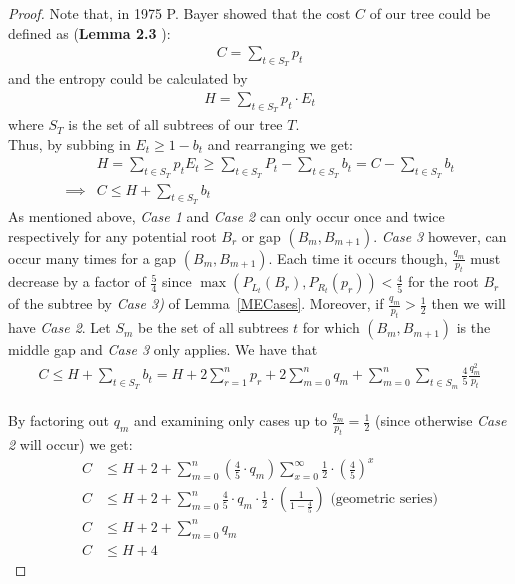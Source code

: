 \documentclass[letterpaper,12pt,titlepage,oneside,final]{book}
\theoremstyle{plain}
\begin{document}
\begin{proof}
Note that, in 1975 P. Bayer showed that the cost $C$ of our tree could be defined as (\textbf{Lemma 2.3} \cite{bayer1975improved}): \\
\begin{align*}
C = \sum_{t \in S_T} p_t
\end{align*}
and the entropy could be calculated by
\begin{align*}
H = \sum_{t \in S_T} p_t \cdot E_t
\end{align*}  
where $S_T$ is the set of all subtrees of our tree $T$. \\

\noindent Thus, by subbing in $E_t \geq 1 - b_t$ and rearranging we get: 
\begin{align*}
&H = \sum_{t \in S_T} p_t E_t \geq \sum_{t \in S_T} P_t - \sum_{t \in S_T} b_t = C - \sum_{t \in S_T} b_t \\
 \implies &C \leq H + \sum_{t \in S_T} b_t
\end{align*}
As mentioned above, \textit{Case 1} and \textit{Case 2} can only occur once and twice respectively for any potential root $B_r$ or gap $(B_m, B_{m+1})$. \textit{Case 3} however, can occur many times for a gap $(B_m, B_{m+1})$. Each time it occurs though, $\frac{q_m}{p_t}$ must decrease by a factor of $\frac{5}{4}$ since $\max(P_{L_t}(B_r), P_{R_t}(p_r)) < \frac{4}{5}$ for the root $B_r$ of the subtree by \textit{Case 3)} of Lemma~\ref{MECases}. Moreover, if $\frac{q_m}{p_t} > \frac{1}{2}$ then we will have \textit{Case 2}. Let $S_m$ be the set of all subtrees $t$ for which $(B_m, B_{m+1})$ is the middle gap and \textit{Case 3} only applies. We have that
\begin{align*}
C \leq H + \sum_{t \in S_T} b_t = H + 2 \sum\limits_{r = 1}^n p_r + 2 \sum\limits_{m = 0}^n q_m + \sum\limits_{m = 0}^n \sum\limits_{t \in S_m} \frac{4}{5}\frac{q_m^2}{p_t}
\end{align*}
 \\ 
By factoring out $q_m$ and examining only cases up to $\frac{q_m}{p_t} = \frac{1}{2}$ (since otherwise \textit{Case 2} will occur) we get:
\begin{align*}
C &\leq H + 2 + \sum\limits_{m = 0}^n (\frac{4}{5} \cdot q_m) \sum\limits_{x=0}^{\infty} \frac{1}{2} \cdot (\frac{4}{5}) ^ x \\
C &\leq H + 2 + \sum\limits_{m = 0}^n \frac{4}{5} \cdot q_m \cdot \frac{1}{2} \cdot (\frac{1}{1-\frac{4}{5}}) \text{    (geometric series)} \\
C &\leq H + 2 + \sum\limits_{m = 0}^n q_m \\
C &\leq H + 4
\end{align*}

\end{proof}
\end{document}
